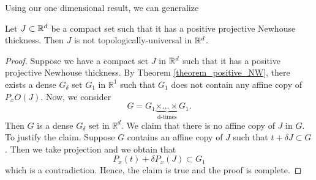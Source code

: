 
Using our one dimensional result, we can generalize 
\begin{theorem}Let $J \subset \mathbb{R}^d$ be a compact set such that it has a positive projective Newhouse thickness. Then $J$ is not topologically-universal in $\mathbb{R}^d$.  
\end{theorem}

\begin{proof}  Suppose we have a compact set $J$ in $\mathbb{R}^d$ such that it has a positive projective Newhouse thickness.  By Theorem \ref{theorem_positive_NW}, there exists a dense $G_{\delta}$ set $G_1$ in ${\mathbb R}^1$ such that $G_1$ does not contain any  affine copy of $P_x O(J)$. Now, we consider 
$$
G = G_1\underbrace{\times \dots \times}_\text{d-times} G_1. 
$$
Then $G$ is a dense $G_{\delta}$ set in ${\mathbb R}^d$. We claim that there is no affine copy of $J$ in $G$. To justify the claim. Suppose $G$ contains an affine copy of $J$ such that $t+\delta J\subset G$.  Then we take projection and we obtain that
$$
P_x(t)+ \delta P_x (J) \subset G_1
$$
which is a contradiction. Hence, the claim is true and the proof is complete. 





\end{proof}